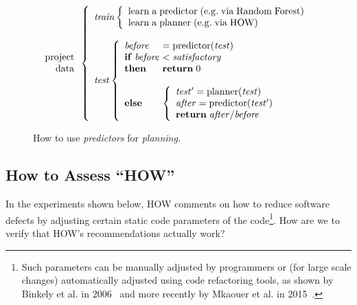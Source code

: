 \documentclass[conference]{IEEEtran}
\begin{document}
\begin{figure}[!t]
\small 
\[
\begin{array}{r}
\mathrm{project}\\
\mathrm{data}
\end{array} 
\left\{\begin{array}{l}\mathit{train}
        \left\{\begin{array}{l}
                \mathrm{learn\;a\;}\mathrm{predictor\;}\mathrm{(e.g.\;via \;Random\;Forest)}\\
                \mathrm{learn\;a\;}\mathrm{planner\;}\mathrm{(e.g.\;via \; HOW)}
              \end{array}\right.
       \\
      ~\\
\mathit{test}  
    \left\{\begin{array}{l@{~}l}
           \mathit{before}& =\mathrm{predictor}(\mathit{test})\\
           \mathrm{\bf if\;}\mathit{before} & <  \mathit{satisfactory}\\
           \mathrm{\bf then}  & \mathrm{{\bf return}\; 0}\\~\\
           \mathrm{\bf else} &
           \left\{
            \begin{array}{l}
                \mathit{test'} = \mathrm{planner}(\mathit{test})\\
                \mathit{after} =\mathrm{predictor}(\mathit{test'})\\ 
                \mathrm{{\bf return}\;} \mathit{after} /  \mathit{before}
            \end{array}
          \right.
   \end{array}\right.
\end{array} \right. 
\]
 
\caption{How to use {\em predictors} for {\em planning}.}\label{fig:work}
\end{figure}



\subsection{How to Assess ``HOW''}
In the experiments shown below,  HOW comments  on how to reduce
software defects by adjusting certain static code parameters of the code\footnote{Such parameters can be manually adjusted by programmers or (for large scale changes) automatically adjusted using code refactoring
tools, as shown by Binkely et al. in 2006~\cite{Binkley2006} and more recently by Mkaouer et al. in 2015~\cite{Mkaouer15}.}. How are we to verify that HOW's recommendations actually work? 
\end{document}
